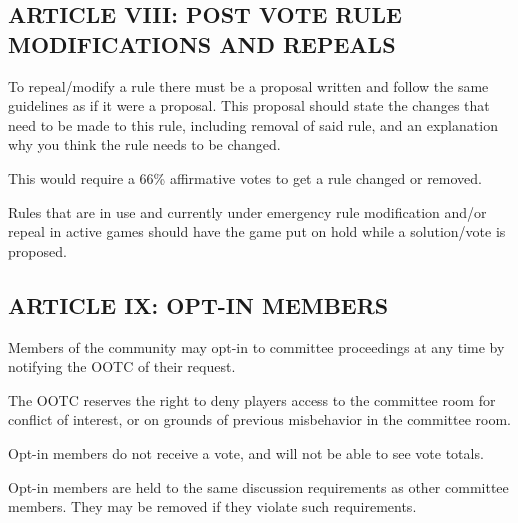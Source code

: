 \subsection{ARTICLE VIII: POST VOTE RULE MODIFICATIONS AND REPEALS}
\begin{deepEnumerate}
    \item To repeal/modify a rule there must be a proposal written and follow the same guidelines as if it were a proposal. 
    This proposal should state the changes that need to be made to this rule, including removal of said rule, and an explanation why you think the rule needs to be changed.
    \begin{deepEnumerate}
        \item This would require a 66\% affirmative votes to get a rule changed or removed.
        \item Rules that are in use and currently under emergency rule modification and/or repeal in active games should have the game put on hold 
        while a solution/vote is proposed.
    \end{deepEnumerate}
\end{deepEnumerate}

\subsection{ARTICLE IX: OPT-IN MEMBERS}
\begin{deepEnumerate}
    \item Members of the community may opt-in to committee proceedings at any time by notifying the OOTC of their request.
    \begin{deepEnumerate}
        \item The OOTC reserves the right to deny players access to the committee room for conflict of interest, or on grounds of previous misbehavior in the committee room.
        \item Opt-in members do not receive a vote, and will not be able to see vote totals.
        \item Opt-in members are held to the same discussion requirements as other committee members. They may be removed if they violate such requirements.
    \end{deepEnumerate}
\end{deepEnumerate}